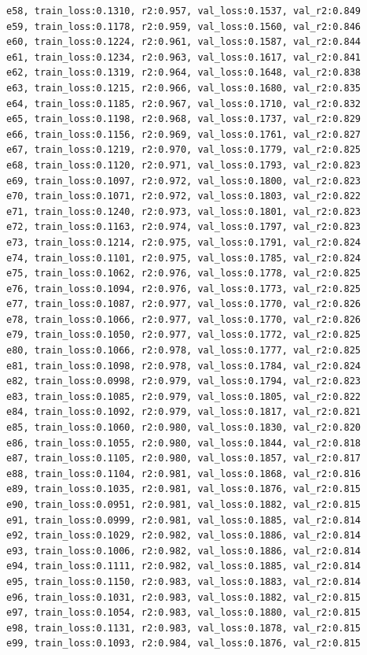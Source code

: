 \documentclass[a4paper, 12pt]{article}
\begin{document}
\begin{lstlisting}
e58, train_loss:0.1310, r2:0.957, val_loss:0.1537, val_r2:0.849
e59, train_loss:0.1178, r2:0.959, val_loss:0.1560, val_r2:0.846
e60, train_loss:0.1224, r2:0.961, val_loss:0.1587, val_r2:0.844
e61, train_loss:0.1234, r2:0.963, val_loss:0.1617, val_r2:0.841
e62, train_loss:0.1319, r2:0.964, val_loss:0.1648, val_r2:0.838
e63, train_loss:0.1215, r2:0.966, val_loss:0.1680, val_r2:0.835
e64, train_loss:0.1185, r2:0.967, val_loss:0.1710, val_r2:0.832
e65, train_loss:0.1198, r2:0.968, val_loss:0.1737, val_r2:0.829
e66, train_loss:0.1156, r2:0.969, val_loss:0.1761, val_r2:0.827
e67, train_loss:0.1219, r2:0.970, val_loss:0.1779, val_r2:0.825
e68, train_loss:0.1120, r2:0.971, val_loss:0.1793, val_r2:0.823
e69, train_loss:0.1097, r2:0.972, val_loss:0.1800, val_r2:0.823
e70, train_loss:0.1071, r2:0.972, val_loss:0.1803, val_r2:0.822
e71, train_loss:0.1240, r2:0.973, val_loss:0.1801, val_r2:0.823
e72, train_loss:0.1163, r2:0.974, val_loss:0.1797, val_r2:0.823
e73, train_loss:0.1214, r2:0.975, val_loss:0.1791, val_r2:0.824
e74, train_loss:0.1101, r2:0.975, val_loss:0.1785, val_r2:0.824
e75, train_loss:0.1062, r2:0.976, val_loss:0.1778, val_r2:0.825
e76, train_loss:0.1094, r2:0.976, val_loss:0.1773, val_r2:0.825
e77, train_loss:0.1087, r2:0.977, val_loss:0.1770, val_r2:0.826
e78, train_loss:0.1066, r2:0.977, val_loss:0.1770, val_r2:0.826
e79, train_loss:0.1050, r2:0.977, val_loss:0.1772, val_r2:0.825
e80, train_loss:0.1066, r2:0.978, val_loss:0.1777, val_r2:0.825
e81, train_loss:0.1098, r2:0.978, val_loss:0.1784, val_r2:0.824
e82, train_loss:0.0998, r2:0.979, val_loss:0.1794, val_r2:0.823
e83, train_loss:0.1085, r2:0.979, val_loss:0.1805, val_r2:0.822
e84, train_loss:0.1092, r2:0.979, val_loss:0.1817, val_r2:0.821
e85, train_loss:0.1060, r2:0.980, val_loss:0.1830, val_r2:0.820
e86, train_loss:0.1055, r2:0.980, val_loss:0.1844, val_r2:0.818
e87, train_loss:0.1105, r2:0.980, val_loss:0.1857, val_r2:0.817
e88, train_loss:0.1104, r2:0.981, val_loss:0.1868, val_r2:0.816
e89, train_loss:0.1035, r2:0.981, val_loss:0.1876, val_r2:0.815
e90, train_loss:0.0951, r2:0.981, val_loss:0.1882, val_r2:0.815
e91, train_loss:0.0999, r2:0.981, val_loss:0.1885, val_r2:0.814
e92, train_loss:0.1029, r2:0.982, val_loss:0.1886, val_r2:0.814
e93, train_loss:0.1006, r2:0.982, val_loss:0.1886, val_r2:0.814
e94, train_loss:0.1111, r2:0.982, val_loss:0.1885, val_r2:0.814
e95, train_loss:0.1150, r2:0.983, val_loss:0.1883, val_r2:0.814
e96, train_loss:0.1031, r2:0.983, val_loss:0.1882, val_r2:0.815
e97, train_loss:0.1054, r2:0.983, val_loss:0.1880, val_r2:0.815
e98, train_loss:0.1131, r2:0.983, val_loss:0.1878, val_r2:0.815
e99, train_loss:0.1093, r2:0.984, val_loss:0.1876, val_r2:0.815


	\end{lstlisting}	
	
\end{document}
